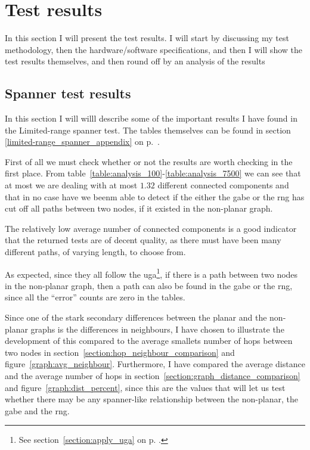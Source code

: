 \section{Test results}
\label{section:test_results}
In this section I will present the test results. I will start by discussing my test methodology, then the hardware/software specifications, and then I will show the test results themselves, and then round off by an analysis of the results 

\subsection{Spanner test results}
In this section I will willl describe some of the important results I have found in the Limited-range spanner test. The tables themselves can be found in section \ref{limited-range_spanner_appendix} on p.~\pageref{limited-range_spanner_appendix}.

First of all we must check whether or not the results are worth checking in the first place. From table~\ref{table:analysis_100}-\ref{table:analysis_7500} we can see that at most we are dealing with at most $1.32$ different connected components and that in no case have we beenm able to detect if the either the \ac{gabe} or the \ac{rng} has cut off all paths between two nodes, if it existed in the non-planar graph. 

The relatively low average number of connected components is a good indicator that the returned tests are of decent quality, as there must have been many different paths, of varying length, to choose from.

As expected, since they all follow the \ac{uga}\footnote{See section~\ref{section:apply_uga} on p. \pageref{section:apply_uga}.}, if there is a path between two nodes in the non-planar graph, then a path can also be found in the \ac{gabe} or the \ac{rng}, since all the ``error'' counts are zero in the tables.

Since one of the stark secondary differences between the planar and the non-planar graphs is the differences in neighbours, I have chosen to illustrate the development of this compared to the average smallets number of hops between two nodes in section~\ref{section:hop_neighbour_comparison} and figure~\ref{graph:avg_neighbour}. Furthermore, I have compared the average distance and the average number of hops in section~\ref{section:graph_distance_comparison} and figure~\ref{graph:dist_percent}, since this are the values that will let us test whether there may be any spanner-like relationship between the non-planar, the \ac{gabe} and the \ac{rng}.

